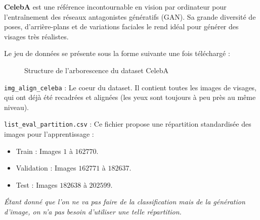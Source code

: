 \documentclass{article}
\begin{document}
\medskip

\textbf{CelebA} est une référence incontournable en vision par ordinateur pour l'entraînement des réseaux antagonistes génératifs (GAN). Sa grande diversité de poses, d'arrière-plans et de variations faciales le rend idéal pour générer des visages très réalistes.

\medskip

\noindent Le jeu de données se présente sous la forme suivante une fois téléchargé :

\begin{figure}[H]
    \centering
    \begin{minipage}{0.9\textwidth}
    \end{minipage}
    \caption{Structure de l'arborescence du dataset CelebA}
    \label{fig:celeba_tree}
\end{figure}

\medskip

\texttt{img\_align\_celeba} : Le coeur du dataset. Il contient toutes les images de visages, qui ont déjà été recadrées et alignées (les yeux sont toujours à peu près au même niveau).

\medskip

\texttt{list\_eval\_partition.csv} : Ce fichier propose une répartition standardisée des images pour l'apprentissage :

\begin{itemize}
    \item Train : Images $1$ à $162 770$.
    \item Validation : Images $162 771$ à $182 637$.
    \item Test : Images $182 638$ à $202 599$.
\end{itemize}

\noindent \textit{Étant donné que l'on ne va pas faire de la classification mais de la génération d'image, on n'a pas besoin d'utiliser une telle répartition.}
\end{document}
